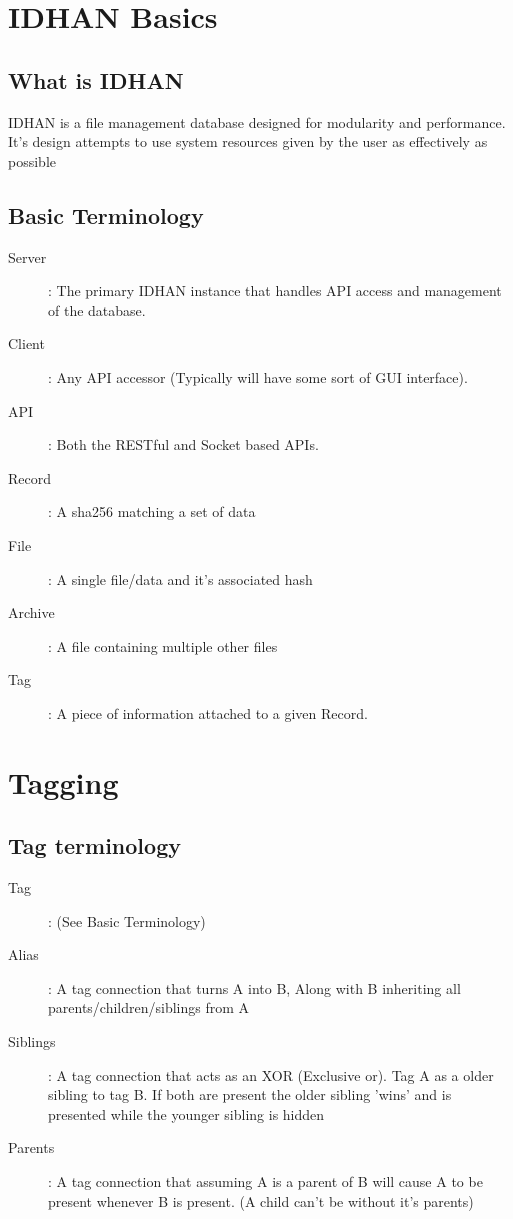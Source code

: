 \documentclass[11pt]{article}
\begin{document}
	\section{IDHAN Basics}
	\subsection[whatisidhan]{What is IDHAN}
	IDHAN is a file management database designed for modularity and performance. It's design attempts to use system resources given by the user as effectively as possible

	\subsection[terms]{Basic Terminology}
	\begin{description}
        	\item[Server]: The primary IDHAN instance that handles API access and management of the database.
	        \item[Client]: Any API accessor (Typically will have some sort of GUI interface).
	        \item[API]: Both the RESTful and Socket based APIs.
	        \item[Record]: A sha256 matching a set of data
	        \item[File]: A single file/data and it's associated hash
	        \item[Archive]: A file containing multiple other files
	        \item[Tag]: A piece of information attached to a given Record.
	\end{description}



	\section{Tagging}
	\subsection[tags-terms]{Tag terminology}
	\begin{description}
	        \item[Tag]: (See Basic Terminology)
	        \item[Alias]: A tag connection that turns A into B, Along with B inheriting all parents/children/siblings from A
	        \item[Siblings]: A tag connection that acts as an XOR (Exclusive or). Tag A as a older sibling to tag B. If both are present the older sibling 'wins' and is presented while the younger sibling is hidden
		\item[Parents]: A tag connection that assuming A is a parent of B will cause A to be present whenever B is present. (A child can't be without it's parents)
	\end{description}
\end{document}
